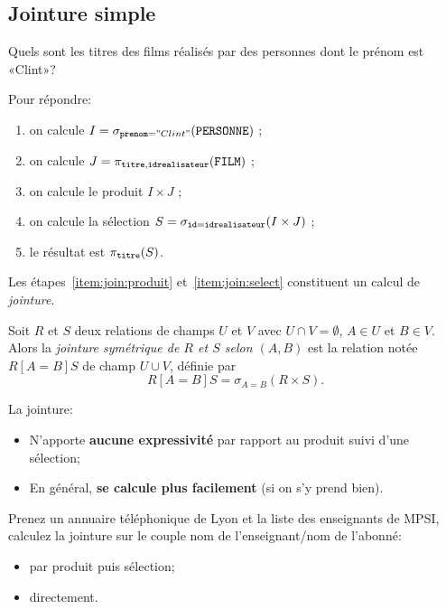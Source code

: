 \subsection{Jointure simple}

Quels sont les titres des films réalisés par des personnes dont le prénom est
«Clint»?

Pour répondre:
\begin{enumerate}
\item on calcule $I=\sigma_{\mathtt{prenom}="Clint"}(\mathtt{PERSONNE})$ ;
\item on calcule $J=\pi_{\mathtt{titre}, \mathtt{idrealisateur}}(\mathtt{FILM})$ ;
\item\label{item:join:produit}on calcule le produit $I\times J$ ;
\item\label{item:join:select}on calcule la sélection
  $S=\sigma_{\mathtt{id}=\mathtt{idrealisateur}}(I\times J)$ ;
\item le résultat est $\pi_{\mathtt{titre}}(S)$.
\end{enumerate}

Les étapes~\ref{item:join:produit} et~\ref{item:join:select}
constituent un calcul de \emph{jointure}.
\begin{defi}[Jointure]
  Soit $R$ et $S$ deux relations de champs $U$ et $V$ avec
  $U\cap V = \emptyset$, $A\in U$ et $B\in V$.
  Alors
  la \emph{jointure symétrique de $R$ et $S$ selon $(A,B)$} est la
  relation notée $R[A=B]S$ de
  champ $U\cup V$, définie par
  \begin{equation*}
    R[A=B] S = \sigma_{A=B}(R\times S).
  \end{equation*}
\end{defi}

La jointure:
\begin{itemize}
\item N'apporte \textbf{aucune expressivité} par rapport au produit suivi d'une
  sélection;
\item En général, \textbf{se calcule plus facilement} (si on s'y prend
  bien).
\end{itemize}

\begin{exemple}
  Prenez un annuaire téléphonique de Lyon et la liste des
enseignants de MPSI, calculez la jointure sur le couple nom de
l'enseignant/nom de l'abonné:
\begin{itemize}
\item par produit puis sélection;
\item directement.
\end{itemize}
\end{exemple}

